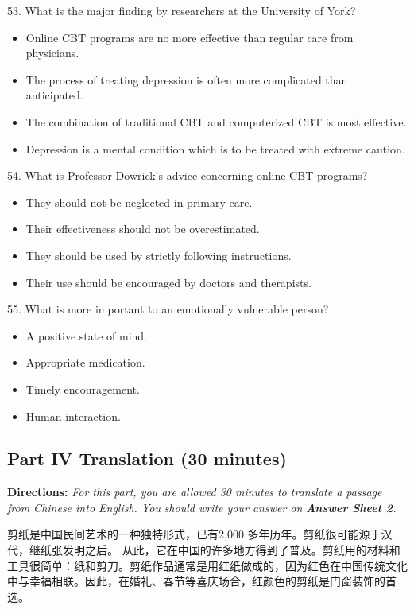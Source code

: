 \documentclass[UTF8,11pt]{ctexart}
\begin{document}
53. What is the major finding by researchers at the University of York?


\begin{itemize}[leftmargin=2em,itemsep=.2em,topsep=.4em]\item[A.] Online CBT programs are no more effective than regular care from physicians.
\item[B.] The process of treating depression is often more complicated than anticipated.
\item[C.] The combination of traditional CBT and computerized CBT is most effective.
\item[D.] Depression is a mental condition which is to be treated with extreme caution.
\end{itemize}

54. What is Professor Dowrick’s advice concerning online CBT programs?


\begin{itemize}[leftmargin=2em,itemsep=.2em,topsep=.4em]\item[A.] They should not be neglected in primary care.
\item[B.] Their effectiveness should not be overestimated.
\item[C.] They should be used by strictly following instructions.
\item[D.] Their use should be encouraged by doctors and therapists.
\end{itemize}

55. What is more important to an emotionally vulnerable person?


\begin{itemize}[leftmargin=2em,itemsep=.2em,topsep=.4em]\item[A.] A positive state of mind.
\item[B.] Appropriate medication.
\item[C.] Timely encouragement.
\item[D.] Human interaction.
\end{itemize}

\subsection*{\textbf{Part} IV \textbf{Translation} \textbf{(30 minutes)}}


\textbf{Directions:}\textit{ For this part, you are allowed 30 minutes to translate a passage from Chinese into English. You} \textit{should write your answer on}\textbf{\textit{ Answer Sheet 2}}\textit{.}


剪纸是中国民间艺术的一种独特形式，已有2,000 多年历年。剪纸很可能源于汉代，继纸张发明之后。 从此，它在中国的许多地方得到了普及。剪纸用的材料和工具很简单：纸和剪刀。剪纸作品通常是用红纸做成的，因为红色在中国传统文化中与幸福相联。因此，在婚礼、春节等喜庆场合，红颜色的剪纸是门窗装饰的首选。
\end{document}
